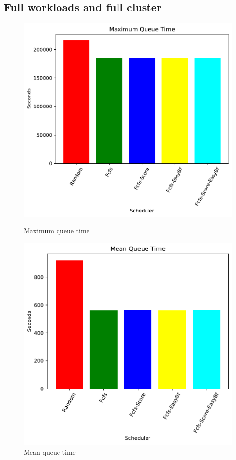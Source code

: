 \documentclass[a4paper]{article}
\begin{document}
	\subsection{Full workloads and full cluster}
	\begin{figure}[H]
	\begin{minipage}[b]{0.5\linewidth}\centering\includegraphics[width=1.11\linewidth]{MBSS/plot/2021-05-23_Maximum_queue_time.pdf}\caption{Maximum queue time}\vspace{4ex}\end{minipage}
	\begin{minipage}[b]{0.5\linewidth}\centering\includegraphics[width=1.11\linewidth]{MBSS/plot/2021-05-23_Mean_queue_time.pdf}\caption{Mean queue time}\vspace{4ex}\end{minipage} 

\end{figure}
\end{document}

